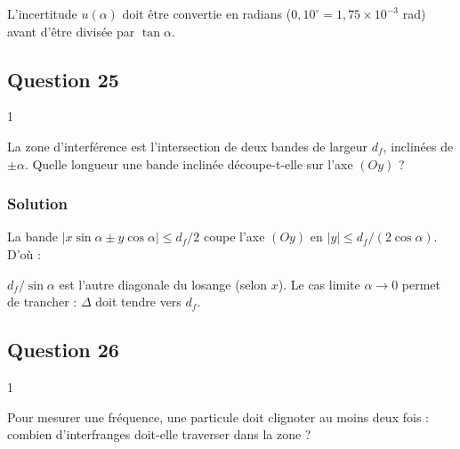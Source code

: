 \documentclass[11pt,a4paper]{article}
\newcommand{\equationajustee}[1]{%
  \sbox{\boiteequation}{$\displaystyle #1$}%
  \ifdim\wd\boiteequation>\linewidth
    \[\resizebox{\linewidth}{!}{\usebox{\boiteequation}}\]%
  \else
    \[#1\]%
  \fi}
\begin{document}
\begin{piege}

L'incertitude \(u(\alpha)\) doit être convertie en radians (\(0{,}10^\circ = 1{,}75\times 10^{-3}\) rad) avant d'être divisée par \(\tan\alpha\).

\end{piege}

\hypertarget{question-25}{%
\subsection{Question 25}\label{question-25}}

\begin{indication}{1}

La zone d'interférence est l'intersection de deux bandes de largeur \(d_f\), inclinées de \(\pm\alpha\). Quelle longueur une bande inclinée découpe-t-elle sur l'axe \((Oy)\) ?

\end{indication}

\hypertarget{solution-24}{%
\subsubsection{Solution}\label{solution-24}}

La bande \(|x\sin\alpha \pm y\cos\alpha| \le d_f/2\) coupe l'axe \((Oy)\) en \(|y| \le d_f/(2\cos\alpha)\). D'où :

\equationajustee{\boxed{\Delta = \frac{d_f}{\cos\alpha}}}

\begin{piege}

\(d_f/\sin\alpha\) est l'autre diagonale du losange (selon \(x\)). Le cas limite \(\alpha \to 0\) permet de trancher : \(\Delta\) doit tendre vers \(d_f\).

\end{piege}

\hypertarget{question-26}{%
\subsection{Question 26}\label{question-26}}

\begin{indication}{1}

Pour mesurer une fréquence, une particule doit clignoter au moins deux fois : combien d'interfranges doit-elle traverser dans la zone ?

\end{indication}
\end{document}
